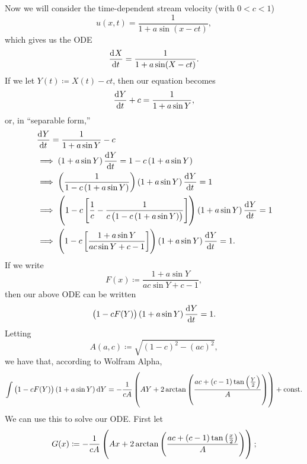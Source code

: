 \documentclass{article}
\begin{document}
Now we will consider the time-dependent stream velocity (with $0 < c <
1$)
%
\begin{equation*}
    u(x, t) = \frac{1}{1 + a \sin (x - c t)}
    ,
\end{equation*}
%
which gives us the ODE
%
\begin{equation*}
    \dod{X}{t} = \frac{1}{1 + a \sin (X - c t)}
    .
\end{equation*}
%
If we let $Y(t) \coloneqq X(t) - c t$, then our equation becomes
%
\begin{equation*}
    \dod{Y}{t} + c = \frac{1}{1 + a \sin Y}
    ,
\end{equation*}
%
or, in ``separable form,''
%
\begin{align*}
    &\dod{Y}{t} = \frac{1}{1 + a \sin Y} - c \\
    &\implies \del{1 + a \sin Y} \dod{Y}{t} = 1 - c \del{1 + a \sin Y} \\
    &\implies \del{\frac{1}{1 - c \del{1 + a \sin Y}}} \del{1 + a \sin Y} \dod{Y}{t} = 1 \\
    &\implies \del{1 - c \sbr{\frac{1}{c} - \frac{1}{c \del{1 - c \del{1 + a \sin Y}}}}} \del{1 + a \sin Y} \dod{Y}{t} = 1 \\
    &\implies \del{1 - c \sbr{\frac{1 + a \sin Y}{a c \sin Y + c - 1}}} \del{1 + a \sin Y} \dod{Y}{t} = 1
    .
\end{align*}
%
If we write
%
\begin{equation*}
    F(x) \coloneqq \frac{1 + a \sin Y}{a c \sin Y + c - 1}
    ,
\end{equation*}
%
then our above ODE can be written
%
\begin{equation*}
    \del{1 - c F(Y)} \del{1 + a \sin Y} \dod{Y}{t} = 1
    .
\end{equation*}
%
Letting
%
\begin{equation*}
    A(a, c) \coloneqq \sqrt{(1 - c)^2 - (ac)^2}
    ,
\end{equation*}
%
we have that, according to Wolfram Alpha,
%
\begin{equation*}
    \int \del{1 - c F(Y)} \del{1 + a \sin Y} \dif {Y}
        = - \frac{1}{c A}
        \del{
            A Y + 2 \arctan
                \del{\frac{a c + (c - 1) \tan \del{\frac{Y}{2}}}{A}}
            } + \text{const}
    .
\end{equation*}
%
We can use this to solve our ODE. First let
%
\begin{equation*}
    G(x) \coloneqq
        - \frac{1}{c A}
        \del{
            A x + 2 \arctan
                \del{\frac{a c + (c - 1) \tan \del{\frac{x}{2}}}{A}}
            }
    ;
\end{equation*}
\end{document}
